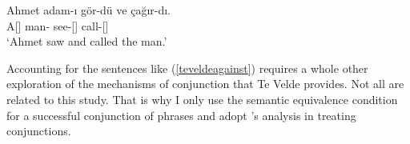\begin{exe}
    \ex \label{teveldeagainst} 
    \gll Ahmet adam-ı gör-dü ve çağır-dı. \\ 
    A[{\Nom}] man-{\Acc} see-{\Pst}[{\Tsg}] {\And} call-{\Pst}[{\Tsg}] \\
    \glt `Ahmet saw and called the man.'
\end{exe}

Accounting for the sentences like (\ref{teveldeagainst}) requires a whole other exploration of the mechanisms of conjunction that Te Velde provides. Not all are related to this study. That is why I only use the semantic equivalence condition for a successful conjunction of phrases and adopt \citet{munn1993topics}'s analysis in treating conjunctions.